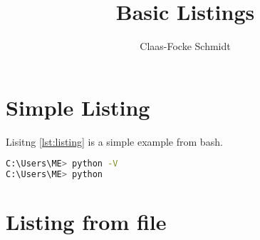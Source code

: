 \documentclass[10pt,a4paper]{article}
\author{Claas-Focke Schmidt}
\title{Basic Listings }
\begin{document}


\section{Simple Listing}
Lisitng \ref{lst:listing} is a simple example from bash. 
\begin{lstlisting}[language=bash, caption={Check Python}, label=lst:listing]
C:\Users\ME> python -V
C:\Users\ME> python
\end{lstlisting}




\section{Listing from file}


\newpage 
\end{document}
